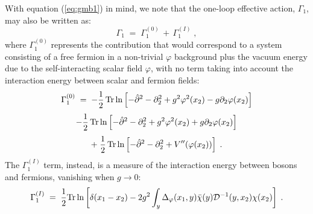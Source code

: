 \documentclass[a4paper,12pt]{article}
\begin{document}
With equation (\ref{eq:gmb1}) in mind, we note that the one-loop
effective action, $\Gamma_1$, may also be written as:
\begin{equation}
  \label{eq:newg1}
\Gamma_1 \;=\; \Gamma_1^{(0)} \,+\, \Gamma_1^{(I)} \;,
\end{equation} 
where $\Gamma_1^{(0)}$ represents the contribution that would
correspond to a system consisting of a free fermion in a non-trivial
$\varphi$ background plus the vacuum energy due to the
self-interacting scalar field $\varphi$, with no term taking into
account the interaction energy between scalar and fermion fields:
$$\Gamma_1^{(0)} \;=\; -\frac{1}{2}\, {\rm Tr}\ln\left[
  -\hat{\partial}^2 - \partial_2^2 + g^2 \varphi^2(x_2) - g \partial_2
  \varphi(x_2) \right] $$
$$-\frac{1}{2}\, {\rm Tr}\ln\left[-\hat{\partial}^2 - \partial_2^2 +
  g^2 \varphi^2(x_2) + g \partial_2 \varphi(x_2) \right] $$
\begin{equation}
+\;\frac{1}{2}\, {\rm Tr}\ln\left[-\hat{\partial}^2 - \partial_2^2 
+ V''(\varphi(x_2)) \right] \;.
\end{equation}
The $\Gamma_1^{(I)}$ term, instead, is a measure of the interaction
energy between bosons and fermions, vanishing when $g \to 0$:
\begin{equation}
  \label{eq:gmi}
\Gamma_1^{(I)}\;=\; \frac{1}{2} {\rm Tr} \ln \left[ \delta(x_1-x_2) 
- 2 g^2 \int_y \Delta_\varphi(x_1,y) {\bar \chi}(y)
{\mathcal D}^{-1}(y,x_2) \chi(x_2) \right] \;.
\end{equation}
\end{document}
